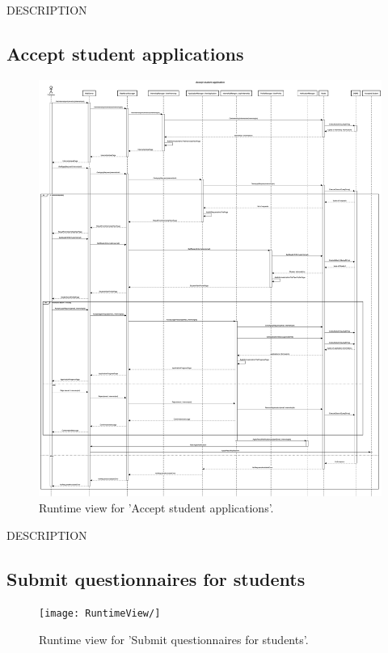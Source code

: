 DESCRIPTION

\subsection{Accept student applications}
\begin{figure}[H]
    \begin{center}
        \includegraphics[width=0.8\linewidth]{DD/LaTeX/Images/RuntimeView/AcceptSTApplication.png}
        \caption{Runtime view for 'Accept student applications'.}
        \label{fig:runtime_AcceptSTApplication}%
    \end{center}
\end{figure}

DESCRIPTION


\subsection{Submit questionnaires for students}
\begin{figure}[H]
    \begin{center}
        \texttt{[image: RuntimeView/]}
        \caption{Runtime view for 'Submit questionnaires for students'.}
        \label{fig:runtime_modifybadge}%
    \end{center}
\end{figure}

